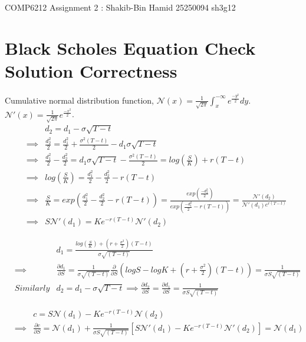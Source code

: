 \documentclass[11pt, fleqn]{article}
\begin{document}
\begin{center}

\Large{COMP6212 Assignment 2 : Shakib-Bin Hamid 25250094 sh3g12}

\end{center}

\section{Black Scholes Equation Check Solution Correctness}

Cumulative normal distribution function, $\mathcal{N}(x) = \frac{1}{\sqrt{2\pi}} \int_x^{-\infty} e^{\frac{-y^2}{2}}dy$. $\mathcal{N}'(x) = \frac{1}{\sqrt{2\pi}}e^{\frac{-x^2}{2}}$.\\

\begin{eqnarray*}
&& d_2 = d_1 - \sigma\sqrt{T-t}\\
&\implies& \frac{d_2^2}{2} = \frac{d_1^2}{2} + \frac{\sigma^2(T-t)}{2} - d_1\sigma\sqrt{T-t}\\
&\implies& \frac{d_1^2}{2} - \frac{d_2^2}{2} = d_1\sigma\sqrt{T-t} - \frac{\sigma^2(T-t)}{2} = log(\frac{S}{K}) + r(T-t)\\
&\implies& log(\frac{S}{K}) = \frac{d_1^2}{2} - \frac{d_2^2}{2} - r(T-t)\\
&\implies& \frac{S}{K} = exp(\frac{d_1^2}{2} - \frac{d_2^2}{2} - r(T-t)) = \frac{exp(\frac{-d_2^2}{2})}{exp(\frac{-d_1^2}{2} - r(T-t))} = \frac{\mathcal{N}'(d_2)}{\mathcal{N}'(d_1)e^{r(T-t)}}\\
&\implies& S\mathcal{N}'(d_1) = Ke^{-r(T-t)}\mathcal{N}'(d_2) 
\end{eqnarray*}


\begin{eqnarray*}
&& d_1 = \frac{log(\frac{S}{K})+(r+\frac{\sigma^2}{2})(T-t)}{\sigma\sqrt{(T-t)}} \\
&\implies& \frac{\partial d_1}{\partial S} = \frac{1}{\sigma\sqrt{(T-t)}} \frac{\partial}{\partial S}(logS - logK + (r+\frac{\sigma^2}{2})(T-t)) = \frac{1}{\sigma S \sqrt{(T-t)}}\\
&Similarly& d_2 = d_1 - \sigma\sqrt{T-t} \implies \frac{\partial d_2}{\partial S} = \frac{\partial d_1}{\partial S}= \frac{1}{\sigma S \sqrt{(T-t)}}
\end{eqnarray*}

\begin{eqnarray*}
&& c = S\mathcal{N}(d_1) - Ke^{-r(T-t)}\mathcal{N}(d_2) \\
&\implies& \frac{\partial c}{\partial S} = \mathcal{N}(d_1) + \frac{1}{\sigma S \sqrt{(T-t)}}[S\mathcal{N}'(d_1) - Ke^{-r(T-t)}\mathcal{N}'(d_2)] = \mathcal{N}(d_1)
\end{eqnarray*}
\end{document}
